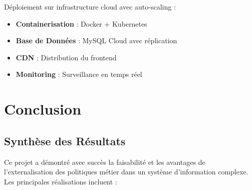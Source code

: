 \documentclass[12pt,a4paper]{article}
\begin{document}
    Déploiement sur infrastructure cloud avec auto-scaling :

    \begin{itemize}
        \item \textbf{Containerisation} : Docker + Kubernetes
        \item \textbf{Base de Données} : MySQL Cloud avec réplication
        \item \textbf{CDN} : Distribution du frontend
        \item \textbf{Monitoring} : Surveillance en temps réel
    \end{itemize}

    \newpage

    \section{Conclusion}

    \subsection{Synthèse des Résultats}

    Ce projet a démontré avec succès la faisabilité et les avantages de l'externalisation des politiques métier dans un système d'information complexe. Les principales réalisations incluent :
\end{document}
